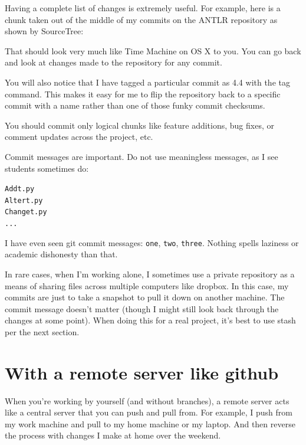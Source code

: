 \documentclass[titlepage]{tufte-book}
\begin{document}
Having a complete list of changes is extremely useful. For example, here is a chunk taken out of the middle of my commits on the ANTLR repository as shown by SourceTree:


That should look very much like Time Machine on OS X to you. You can go back and look at changes made to the repository for any commit.

You will also notice that I have tagged a particular commit as 4.4 with the tag command. This makes it easy for me to flip the repository back to a specific commit with a name rather than one of those funky commit checksums.

You should commit only logical chunks like feature additions, bug fixes, or comment updates across the project, etc.

Commit messages are important. Do not use meaningless messages, as I see students sometimes do:

\begin{alltt}
Add t.py
Alter t.py
Change t.py
...
\end{alltt}

I have even seen git commit messages: {\tt one}, {\tt two}, {\tt three}. Nothing spells laziness or academic dishonesty than that.

In rare cases, when I'm working alone, I sometimes use a private repository as a means of sharing files across multiple computers like dropbox. In this case, my commits are just to take a snapshot to pull it down on another machine. The commit message doesn't matter (though I might still look back through the changes at some point). When doing this for a real project, it's best to use stash per the next section.

\section{With a remote server like github}

When you're working by yourself (and without branches), a remote server acts like a central server that you can push and pull from. For example, I push from my work machine and pull to my home machine or my laptop. And then reverse the process with changes I make at home over the weekend.
\end{document}

